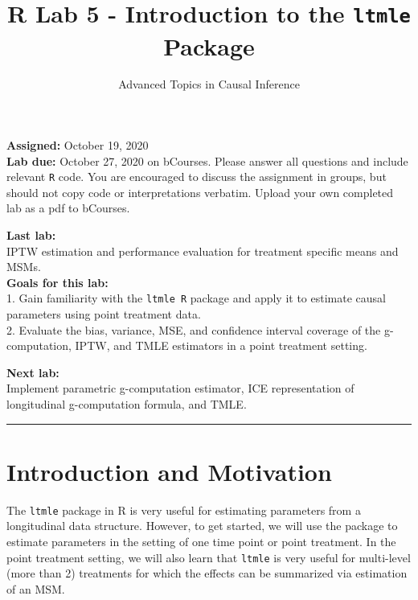 \documentclass[answers]{exam}
\title{R Lab 5 - Introduction to the \texttt{ltmle} Package}
\author{Advanced Topics in Causal Inference}
\date{}
\begin{document}
\maketitle



\maketitle
\noindent \textbf{Assigned:} October 19, 2020\\
\textbf{Lab due:} October 27, 2020 on bCourses. Please answer all questions and include relevant \texttt{R} code. You are encouraged to discuss the assignment in groups, but should not copy code or interpretations verbatim. Upload your own completed lab as a pdf to bCourses.



\noindent \textbf{Last lab:} \\ 
IPTW estimation and performance evaluation for treatment specific means and MSMs.\\


\noindent \textbf{Goals for this lab:} \\
1. Gain familiarity with the \texttt{ltmle R} package and apply it to estimate causal parameters using point treatment data.\\
2. Evaluate the bias, variance, MSE, and confidence interval coverage of the g-computation, IPTW, and TMLE estimators in a point treatment setting.


\noindent \textbf{Next lab:}\\
Implement parametric g-computation estimator, ICE representation of longitudinal g-computation formula, and TMLE.

\begin{center}
\noindent\rule{18cm}{0.4pt}
\end{center}

\section{Introduction and Motivation}

The \texttt{ltmle} package in R is very useful for estimating parameters from a longitudinal data structure. However, to get started, we will use the package to estimate parameters in the setting of one time point or point treatment. In the point treatment setting, we will also learn that \texttt{ltmle} is very useful for multi-level (more than 2) treatments  for which the effects can be summarized via estimation of an MSM.
\end{document}

